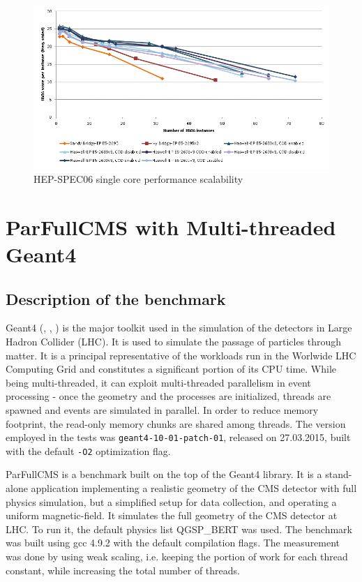 \documentclass[a4paper]{jpconf}
\begin{document}
\begin{figure}[ht]
\centering
  \includegraphics[width=\textwidth]{hs06_per_core}
  \caption{HEP-SPEC06 single core performance scalability}
  \label{fig:hs06_per_core}
\end{figure}




\section{ParFullCMS with Multi-threaded Geant4}

\subsection{Description of the benchmark}
Geant4 (\cite{geant4-1}, \cite{geant4-2}, \cite{geant4-3}) is the major toolkit used in the simulation of the detectors in Large Hadron Collider (LHC). It is used to simulate the passage of particles through matter. It is a principal representative of the workloads run in the Worlwide LHC Computing Grid and constitutes a significant portion of its CPU time. While being multi-threaded, it can exploit multi-threaded parallelism in event processing - once the geometry and the processes are initialized, threads are spawned and events are simulated in parallel. In order to reduce memory footprint, the read-only memory chunks are shared among threads. The version employed in the tests was \verb!geant4-10-01-patch-01!, released on 27.03.2015, built with the default \verb!-O2! optimization flag.

ParFullCMS is a benchmark built on the top of the Geant4 library. It is a stand-alone application implementing a realistic geometry of the CMS detector with full physics simulation, but a simplified setup for data collection, and operating a uniform magnetic-field. It simulates the full geometry of the CMS detector at LHC. To run it, the default physics list QGSP\_BERT was used. The benchmark was built using gcc 4.9.2 with the default compilation flags. The measurement was done by using weak scaling, i.e. keeping the portion of work for each thread constant, while increasing the total number of threads.
\end{document}
